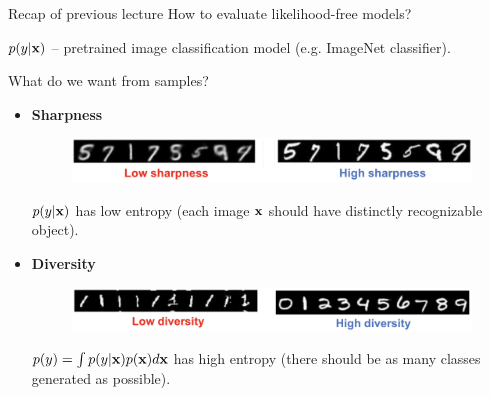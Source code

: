 \begin{frame}{Recap of previous lecture}
	How to evaluate likelihood-free models?
	
	$p(y | \mathbf{x})$ -- pretrained image classification model (e.g. ImageNet classifier).
	\begin{block}{What do we want from samples?}
		\begin{itemize}
			\item \textbf{Sharpness}
			\begin{figure}
				\centering
				\includegraphics[width=0.9\linewidth]{figs/sharpness}
			\end{figure}
			$p(y | \mathbf{x})$ has low entropy (each image $\mathbf{x}$ should have distinctly recognizable object).
			\item \textbf{Diversity}
			\begin{figure}
				\centering
				\includegraphics[width=0.9\linewidth]{figs/diversity}
			\end{figure}
			$p(y) = \int p(y | \mathbf{x}) p(\mathbf{x}) d \mathbf{x}$ has high entropy (there should be as many classes generated as possible).
		\end{itemize}
	\end{block}
\end{frame}
